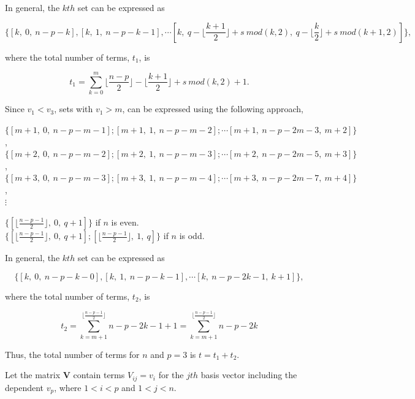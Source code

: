 \documentclass[3p,times]{elsarticle}
\begin{document}
In general, the $kth$ set can be expressed as 

\begin{equation}
\{[k,\ 0,\ n-p-k], [k,\ 1,\ n-p-k-1], \cdots [k,\ q-\lfloor \frac{k+1}{2}\rfloor+s\ mod(k,2),\ q-\lfloor \frac{k}{2}\rfloor+s\ mod(k+1,2)]\},
\end{equation}

where the total number of terms, $t_1$, is

\begin{equation}
t_1=\sum_{k=0}^{m} \lfloor\frac{n-p}{2}\rfloor-\lfloor\frac{k+1}{2}\rfloor+s\ mod(k,2)+1.
\end{equation}

Since $v_1<v_3$, sets with $v_1>m$, can be expressed using the following approach,

\begin{center}
$\{[m+1,\ 0,\ n-p-m-1]; [m+1,\ 1,\ n-p-m-2]; \cdots [m+1,\ n-p-2m-3,\ m+2]\}$,\\
$\{[m+2,\ 0,\ n-p-m-2]; [m+2,\ 1,\ n-p-m-3]; \cdots [m+2,\ n-p-2m-5,\ m+3]\}$,\\
$\{[m+3,\ 0,\ n-p-m-3]; [m+3,\ 1,\ n-p-m-4]; \cdots [m+3,\ n-p-2m-7,\ m+4]\}$,\\
$\vdots$ \\
\end{center}

\begin{center}
$\{[\lfloor\frac{n-p-1}{2}\rfloor,\ 0,\ q+1]\}$ if $n$ is even.\\
$\{[\lfloor\frac{n-p-1}{2}\rfloor,\ 0,\ q+1]; [\lfloor\frac{n-p-1}{2}\rfloor,\ 1,\ q]\}$ if $n$ is odd.
\end{center} 

In general, the $kth$ set can be expressed as 

\begin{equation}
\{[k,\ 0,\ n-p-k-0], [k,\ 1,\ n-p-k-1], \cdots [k,\ n-p-2k-1,\ k+1]\},
\end{equation}

where the total number of terms, $t_2$, is

\begin{equation}
t_2=\sum_{k=m+1}^{\lfloor\frac{n-p-1}{2}\rfloor} n-p-2k-1+1 =\sum_{k=m+1}^{\lfloor\frac{n-p-1}{2}\rfloor} n-p-2k
\end{equation}

Thus, the total number of terms for $n$ and $p=3$ is $t=t_1+t_2$.  

Let the matrix $\textbf{V}$ contain terms $V_{ij}=v_i$ for the $jth$ basis vector including the dependent $v_p$, where $1<i<p$ and $1<j<n$.
\end{document}
